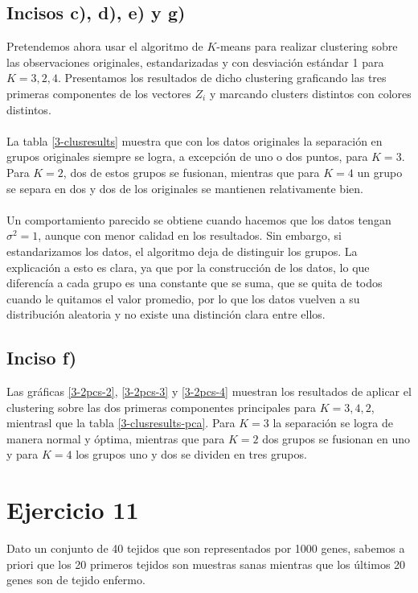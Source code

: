 \documentclass[11pt]{article}
\begin{document}
\subsection{Incisos c), d), e) y g)}
Pretendemos ahora usar el algoritmo de $K$-means para realizar clustering sobre las observaciones originales, estandarizadas y con desviación estándar 1 para $K=3,2,4$. Presentamos los resultados de dicho clustering graficando las tres primeras componentes de los vectores $Z_i$ y marcando clusters distintos con colores distintos.
\\
\\La tabla \ref{3-clusresults} muestra que con los datos originales la separación en grupos originales siempre se logra, a excepción de uno o dos puntos, para $K=3$. Para $K=2$, dos de estos grupos se fusionan, mientras que para $K=4$ un grupo se separa en dos y dos de los originales se  mantienen relativamente bien.
\\
\\Un comportamiento parecido se obtiene cuando hacemos que los datos tengan $\sigma^2 = 1$, aunque con menor calidad en los resultados. Sin embargo, si estandarizamos los datos, el algoritmo deja de distinguir los grupos. La explicación a esto es clara, ya que por la construcción de los datos, lo que diferencía a cada grupo es una constante que se suma, que se quita de todos cuando le quitamos el valor promedio, por lo que los datos vuelven a su distribución aleatoria y no existe una distinción clara entre ellos.
\subsection{Inciso f)}
Las gráficas \ref{3-2pcs-2}, \ref{3-2pcs-3} y \ref{3-2pcs-4} muestran los resultados de aplicar el clustering sobre las dos primeras componentes principales para $K=3,4,2$, mientrasl que la tabla \ref{3-clusresults-pca}. Para $K=3$ la separación se logra de manera normal y óptima, mientras que para $K=2$ dos grupos se fusionan en uno y para $K=4$ los grupos uno y dos se dividen en tres grupos.
\section{Ejercicio 11}
Dato un conjunto de 40 tejidos que son representados por 1000 genes, sabemos a priori que los 20 primeros tejidos son muestras sanas mientras que los últimos 20 genes son de tejido enfermo. 
\end{document}
